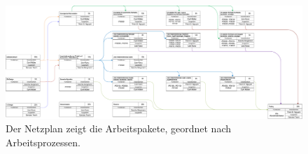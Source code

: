 \begin{landscape}
\vspace*{\fill}
\begin{figure}[H]
\includegraphics[width=\linewidth]{graphics/netzplan_s2.pdf}
\caption{Der Netzplan zeigt die Arbeitspakete, geordnet nach Arbeitsprozessen.}
\label{fig:netzplan}
\end{figure}
\vspace*{\fill}
\end{landscape}
